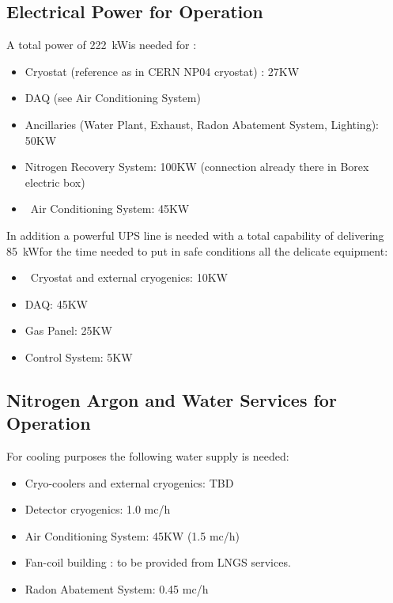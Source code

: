 \subsection{Electrical Power for \DSks Operation}
\label{sec:ElectricalPower}

\newcommand{\TotalPowerConsumption}{\SI{222}{\kW}}
\newcommand{\TotalUPSPowerConsumption}{\SI{85}{\kW}}

A total power of \TotalPowerConsumption  is needed for \DSks:

\begin{itemize}
\item Cryostat (reference as in CERN NP04 cryostat) : 27KW 
\item	DAQ (see Air Conditioning System) 
\item	Ancillaries (Water Plant, Exhaust, Radon Abatement System, Lighting): 50KW 
\item Nitrogen Recovery System: 100KW (connection already there in Borex electric box)
\item Air Conditioning System: 45KW 
\end{itemize}
\vspace{\baselineskip}

In addition a powerful UPS line is needed with a total capability of delivering \TotalUPSPowerConsumption for 
the time needed to put in safe conditions all the delicate equipment: 
\begin{itemize}
\item Cryostat and external cryogenics: 10KW
\item DAQ: 45KW 
\item Gas Panel: 25KW 
\item Control System: 5KW 
\end{itemize}

\subsection{Nitrogen Argon and Water Services for \DSks Operation}
\label{sec:NitrogenArgonAndWater}

For cooling purposes the following water supply is needed:
\begin{itemize} 
\item Cryo-coolers and external cryogenics: TBD 
\item Detector cryogenics: 1.0 mc/h 
\item Air Conditioning System: 45KW (1.5 mc/h)
\item Fan-coil building : to be provided from LNGS services.
\item Radon Abatement System: 0.45 mc/h 
\end{itemize} 

